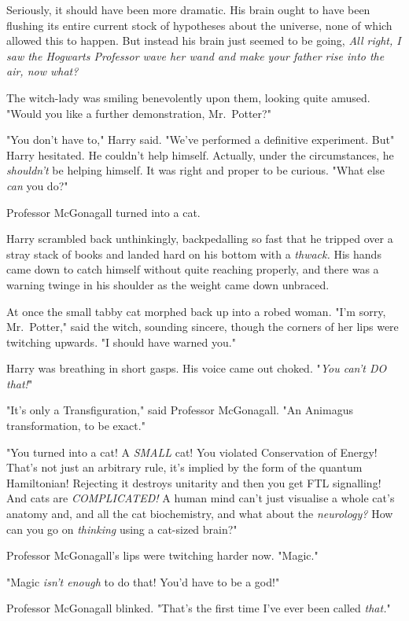Seriously, it should have been more dramatic. His brain ought to have been
flushing its entire current stock of hypotheses about the universe, none of
which allowed this to happen. But instead his brain just seemed to be going,
\emph{All right, I saw the Hogwarts Professor wave her wand and make your
father rise into the air, now what?}

The witch-lady was smiling benevolently upon them, looking quite amused. "Would
you like a further demonstration, Mr.~Potter?"

"You don't have to," Harry said. "We've performed a definitive experiment.
But{\el}" Harry hesitated. He couldn't help himself. Actually, under the
circumstances, he \emph{shouldn't} be helping himself. It was right and proper
to be curious. "What else \emph{can} you do?"

Professor McGonagall turned into a cat.

Harry scrambled back unthinkingly, backpedalling so fast that he tripped over a
stray stack of books and landed hard on his bottom with a \emph{thwack.} His
hands came down to catch himself without quite reaching properly, and there was
a warning twinge in his shoulder as the weight came down unbraced.

At once the small tabby cat morphed back up into a robed woman. "I'm sorry,
Mr.~Potter," said the witch, sounding sincere, though the corners of her lips
were twitching upwards. "I should have warned you."

Harry was breathing in short gasps. His voice came out choked. "\emph{You can't
DO that!}"

"It's only a Transfiguration," said Professor McGonagall. "An Animagus
transformation, to be exact."

"You turned into a cat! A \emph{SMALL} cat! You violated Conservation of
Energy! That's not just an arbitrary rule, it's implied by the form of the
quantum Hamiltonian! Rejecting it destroys unitarity and then you get FTL
signalling! And cats are \emph{COMPLICATED!} A human mind can't just visualise
a whole cat's anatomy and, and all the cat biochemistry, and what about the
\emph{neurology?} How can you go on \emph{thinking} using a cat-sized brain?"

Professor McGonagall's lips were twitching harder now. "Mag\-ic."

"Magic \emph{isn't enough} to do that! You'd have to be a god!"

Professor McGonagall blinked. "That's the first time I've ever been called
\emph{that.}"

